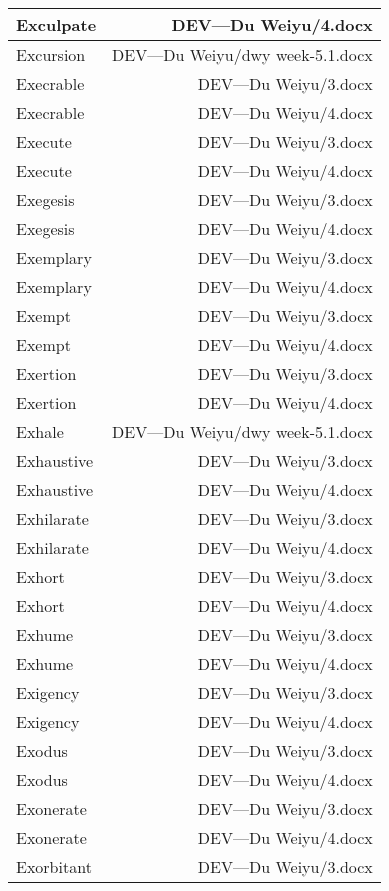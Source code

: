 \documentclass{article}
\begin{document}
\begin{center}
\begin{longtable}{|l|r|}
Exculpate  &  DEV---Du Weiyu/4.docx\\  
\hline
Excursion  &  DEV---Du Weiyu/dwy week-5.1.docx\\  
\hline
Execrable  &  DEV---Du Weiyu/3.docx\\  
\hline
Execrable  &  DEV---Du Weiyu/4.docx\\  
\hline
Execute  &  DEV---Du Weiyu/3.docx\\  
\hline
Execute  &  DEV---Du Weiyu/4.docx\\  
\hline
Exegesis  &  DEV---Du Weiyu/3.docx\\  
\hline
Exegesis  &  DEV---Du Weiyu/4.docx\\  
\hline
Exemplary  &  DEV---Du Weiyu/3.docx\\  
\hline
Exemplary  &  DEV---Du Weiyu/4.docx\\  
\hline
Exempt  &  DEV---Du Weiyu/3.docx\\  
\hline
Exempt  &  DEV---Du Weiyu/4.docx\\  
\hline
Exertion  &  DEV---Du Weiyu/3.docx\\  
\hline
Exertion  &  DEV---Du Weiyu/4.docx\\  
\hline
Exhale  &  DEV---Du Weiyu/dwy week-5.1.docx\\  
\hline
Exhaustive  &  DEV---Du Weiyu/3.docx\\  
\hline
Exhaustive  &  DEV---Du Weiyu/4.docx\\  
\hline
Exhilarate  &  DEV---Du Weiyu/3.docx\\  
\hline
Exhilarate  &  DEV---Du Weiyu/4.docx\\  
\hline
Exhort  &  DEV---Du Weiyu/3.docx\\  
\hline
Exhort  &  DEV---Du Weiyu/4.docx\\  
\hline
Exhume  &  DEV---Du Weiyu/3.docx\\  
\hline
Exhume  &  DEV---Du Weiyu/4.docx\\  
\hline
Exigency  &  DEV---Du Weiyu/3.docx\\  
\hline
Exigency  &  DEV---Du Weiyu/4.docx\\  
\hline
Exodus  &  DEV---Du Weiyu/3.docx\\  
\hline
Exodus  &  DEV---Du Weiyu/4.docx\\  
\hline
Exonerate  &  DEV---Du Weiyu/3.docx\\  
\hline
Exonerate  &  DEV---Du Weiyu/4.docx\\  
\hline
Exorbitant  &  DEV---Du Weiyu/3.docx\\  
\hline

\end{longtable}
\end{center}
\end{document}
